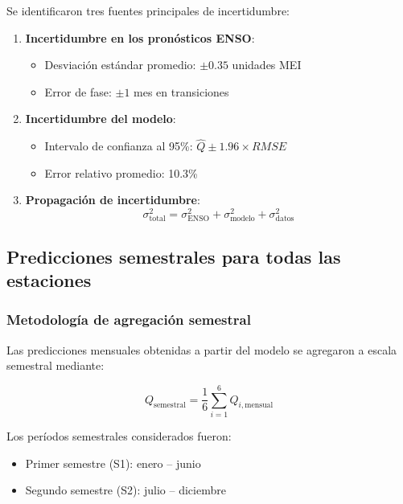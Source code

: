 Se identificaron tres fuentes principales de incertidumbre:

\begin{enumerate}
    \item \textbf{Incertidumbre en los pronósticos ENSO}:
    \begin{itemize}
        \item Desviación estándar promedio: $\pm 0.35$ unidades MEI
        \item Error de fase: $\pm 1$ mes en transiciones
    \end{itemize}

    \item \textbf{Incertidumbre del modelo}:
    \begin{itemize}
        \item Intervalo de confianza al 95\%: $\hat{Q} \pm 1.96 \times RMSE$
        \item Error relativo promedio: 10.3\%
    \end{itemize}

    \item \textbf{Propagación de incertidumbre}:
    \begin{equation}
        \sigma_{\text{total}}^2 = \sigma_{\text{ENSO}}^2 + \sigma_{\text{modelo}}^2 + \sigma_{\text{datos}}^2
    \end{equation}
\end{enumerate}

\subsection{Predicciones semestrales para todas las estaciones}

\subsubsection{Metodología de agregación semestral}

Las predicciones mensuales obtenidas a partir del modelo se agregaron a escala semestral mediante:

\begin{equation}
Q_{\text{semestral}} = \frac{1}{6} \sum_{i=1}^{6} Q_{i,\text{mensual}}
\end{equation}

Los períodos semestrales considerados fueron:

\begin{itemize}
    \item Primer semestre (S1): enero -- junio
    \item Segundo semestre (S2): julio -- diciembre
\end{itemize}

